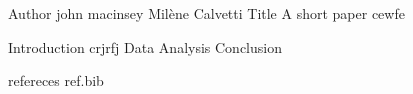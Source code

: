 Author john macinsey Milène Calvetti 
Title A short paper cewfe

Introduction crjrfj  
Data 
Analysis
Conclusion

refereces 
ref.bib

